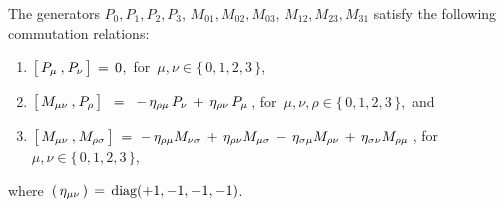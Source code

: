 \vskip 0.5cm
\begin{proposition}
\label{CommRelationsPM}
\mbox{}
\vskip 0.1cm
\noindent
The generators \;\;
$P_{0}, P_{1}, P_{2}, P_{3}$,\;\;
$M_{01}, M_{02}, M_{03}$,\;\;
$M_{12}, M_{23}, M_{31}$\;\;
satisfy the following commutation relations:
\begin{enumerate}
\item
	$\left[\,P_{\mu}\,\overset{{\color{white}1}}{,}\,P_{\nu}\,\right] \,=\, 0$,\,
	for \,$\mu, \nu \in \{\,0,1,2,3\,\}$,
\item
	$
	\left[\,
		M_{\mu\nu}
		\,\overset{{\color{white}1}}{,}\,
		P_{\rho}
		\,\right]
	\;\; = \;\;
		-\,
		\eta_{\rho\mu}\,P_{\nu}
		\,+\,
		\eta_{\rho\nu}\,P_{\mu}
	$\,,\;
	for \,$\mu, \nu, \rho \in \{\,0,1,2,3\,\}$,\, and
\item
	$
	\left[\,
		M_{\mu\nu}
		\,\overset{{\color{white}1}}{,}\,
		M_{\rho\sigma}
		\,\right]
	\; = \,
		\,-\,
		\eta_{\rho\mu}M_{\nu\sigma}
		\,+\,
		\eta_{\rho\nu}M_{\mu\sigma}
		\,-\,
		\eta_{\sigma\mu}M_{\rho\nu}
		\,+\,
		\eta_{\sigma\nu}M_{\rho\mu}
	$\,,\;
	for \,$\mu, \nu \in \{\,0,1,2,3\,\}$,
\end{enumerate}
where
\,$\left(\,\eta_{\mu\nu}\,\right) \,=\, \textnormal{diag}(+1,-1,-1,-1)$.
\end{proposition}
\proof
